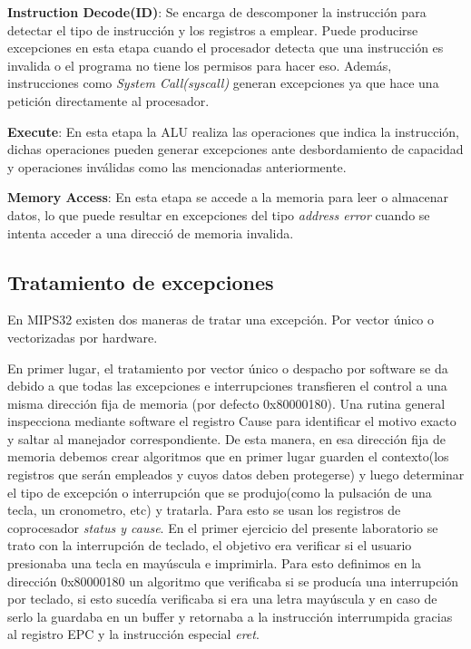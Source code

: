 \documentclass[12pt, a4paper]{article}
\begin{document}
\textbf{Instruction Decode(ID)}: Se encarga de descomponer la instrucción para detectar el tipo de instrucción y los registros a emplear. Puede producirse excepciones en esta etapa cuando el procesador detecta que una instrucción es invalida o el programa no tiene los permisos para hacer eso. Además, instrucciones como \textit{System Call(syscall)} generan excepciones ya que hace una petición directamente al procesador.

\textbf{Execute}: En esta etapa la ALU realiza las operaciones que indica la instrucción, dichas operaciones pueden generar excepciones ante desbordamiento de capacidad y operaciones inválidas como las mencionadas anteriormente.

\textbf{Memory Access}: En esta etapa se accede a la memoria para leer o almacenar datos, lo que puede resultar en excepciones del tipo \textit{address error} cuando se intenta acceder a una direcció de memoria invalida.

\subsection{Tratamiento de excepciones}
En MIPS32 existen dos maneras de tratar una excepción. Por vector único o vectorizadas por hardware.

En primer lugar, el tratamiento por vector único o despacho por software se da debido a que todas las excepciones e interrupciones transfieren el control a una misma dirección fija de memoria (por defecto 0x80000180). Una rutina general inspecciona mediante software el registro Cause para identificar el motivo exacto y saltar al manejador correspondiente. De esta manera, en esa dirección fija de memoria debemos crear algoritmos que en primer lugar guarden el contexto(los registros que serán empleados y cuyos datos deben protegerse) y luego determinar el tipo de excepción o interrupción que se produjo(como la pulsación de una tecla, un cronometro, etc) y tratarla. Para esto se usan los registros de coprocesador \textit{status y cause}. En el primer ejercicio del presente laboratorio se trato con la interrupción de teclado, el objetivo era verificar si el usuario presionaba una tecla en mayúscula e imprimirla. Para esto definimos en la dirección 0x80000180 un algoritmo que verificaba si se producía una interrupción por teclado, si esto sucedía verificaba si era una letra mayúscula y en caso de serlo la guardaba en un buffer y retornaba a la instrucción interrumpida gracias al registro EPC y la instrucción especial \textit{eret}.
\end{document}
